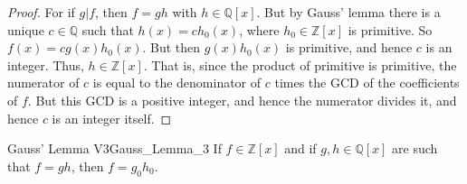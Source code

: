     \begin{proof}
        For if $g|f$, then $f=gh$ with $h\in\mathbb{Q}[x]$. But by Gauss'
        lemma there is a unique $c\in\mathbb{Q}$ such that
        $h(x)=ch_{0}(x)$, where $h_{0}\in\mathbb{Z}[x]$ is primitive. So
        $f(x)=cg(x)h_{0}(x)$. But then $g(x)h_{0}(x)$ is primitive, and
        hence $c$ is an integer. Thus, $h\in\mathbb{Z}[x]$. That is, since
        the product of primitive is primitive, the numerator of $c$ is equal
        to the denominator of $c$ times the GCD of the coefficients of $f$.
        But this GCD is a positive integer, and hence the numerator divides
        it, and hence $c$ is an integer itself.
    \end{proof}
    \begin{ltheorem}{Gauss' Lemma V3}{Gauss_Lemma_3}
        If $f\in\mathbb{Z}[x]$ and if $g,h\in\mathbb{Q}[x]$ are such that
        $f=gh$, then $f=g_{0}h_{0}$.
    \end{ltheorem}
